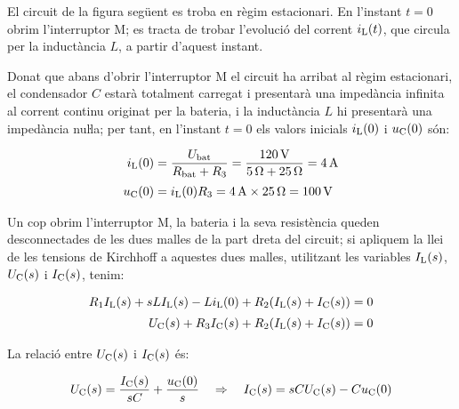 \begin{exemple}
    El circuit de la figura següent es troba en règim estacionari. En
    l'instant $t=0$ obrim l'interruptor M; es tracta de trobar
    l'evolució del corrent $i_\mathrm{L}(t)$, que circula per la inductància
    $L$, a partir d'aquest instant.

    \begin{center}
        
    \end{center}

     Donat que abans d'obrir l'interruptor M el circuit ha arribat al
     règim estacionari, el condensador $C$ estarà totalment carregat  i
     presentarà una impedància infinita al corrent continu originat per la
     bateria, i la inductància $L$ hi presentarà una impedància nuŀla;
     per tant, en l'instant $t=0$ els valors inicials $i_\mathrm{L}(0)$ i
     $u_\mathrm{C}(0)$ són:

     \begin{align*}
        i_\mathrm{L}(0) &= \frac{U_\mathrm{bat}}{R_\mathrm{bat} + R_3} = \frac{\qty{120}{V}}
        {\qty{5}{\ohm} + \qty{25}{\ohm}} = \qty{4}{A} \\[0.5ex]
        u_\mathrm{C}(0) &= i_\mathrm{L}(0) R_3 = \qty{4}{A}\times \qty{25}{\ohm} = \qty{100}{V}
     \end{align*}

    Un cop obrim l'interruptor M, la bateria i la seva resistència
    queden desconnectades de les dues malles de la part dreta del circuit; si apliquem la llei de les tensions de Kirchhoff  a aquestes
    dues malles, utilitzant les variables $I_\mathrm{L}(s)$, $U_\mathrm{C}(s)$ i
    $I_\mathrm{C}(s)$, tenim:

    \begin{align*}
        R_1 I_\mathrm{L}(s) + s L I_\mathrm{L}(s) - L i_\mathrm{L}(0) + R_2
        (I_\mathrm{L}(s) + I_\mathrm{C}(s)) &=0 \\[0.5ex]
        U_\mathrm{C}(s) + R_3 I_\mathrm{C}(s) + R_2 (I_\mathrm{L}(s) + I_\mathrm{C}(s)) &=0
    \end{align*}

    La relació entre $U_\mathrm{C}(s)$ i $I_\mathrm{C}(s)$ és:

    \begin{equation*}
        U_\mathrm{C}(s) = \frac{I_\mathrm{C}(s)}{s C} + \frac{u_\mathrm{C}(0)}{s}
        \quad\Rightarrow\quad I_\mathrm{C}(s) = s C U_\mathrm{C}(s) - C u_\mathrm{C}(0)
    \end{equation*}


\end{exemple}
